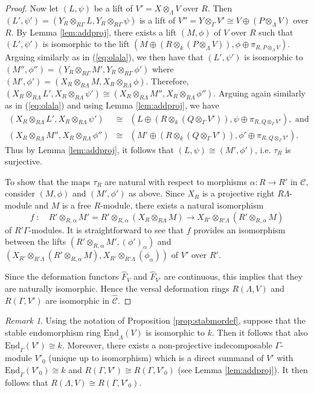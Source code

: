 \documentclass{amsart}
\theoremstyle{plain}
\theoremstyle{definition}
\theoremstyle{remark}
\newtheorem{rem}[thm]{Remark}
\begin{document}
\begin{proof}
Now let $(L,\psi)$ be a lift of $V'=X\otimes_{\Lambda}V$ over $R$.  Then 
$(L',\psi')= (Y_R\otimes_{R\Gamma}L,Y_R\otimes_{R\Gamma}\psi)$ is a lift of 
$V''=Y\otimes_{\Gamma}V'\cong V \oplus (P\otimes_\Lambda V)$ over $R$. By Lemma \ref{lem:addproj}, there exists a lift 
$(M,\phi)$ of $V$ over $R$ such that $(L',\psi')$ is isomorphic to the lift
$\left(M\oplus (R\otimes_k (P\otimes_\Lambda V)),\phi\oplus\pi_{R,P\otimes_\Lambda V}\right)$.
Arguing similarly as in (\ref{eq:olala}), we then have that $(L',\psi')$ is isomorphic to $(M'',\phi'')=
(Y_R\otimes_{R\Gamma}M',Y_R\otimes_{R\Gamma}\phi')$ where $(M',\phi')=(X_R \otimes_{R\Lambda}M,X_R\otimes_{R\Lambda}\phi)$. Therefore, $(X_R\otimes_{R\Lambda}L' ,X_R\otimes_{R\Lambda}\psi')\cong (X_R\otimes_{R\Lambda}M'',X_R\otimes_{R\Lambda}\phi'')$.
Arguing again similarly as in (\ref{eq:olala}) and using Lemma \ref{lem:addproj}, we have 
\begin{eqnarray*}
(X_R\otimes_{R\Lambda}L' ,X_R\otimes_{R\Lambda}\psi') 
&\cong&\left(L\oplus (R\otimes_k (Q\otimes_\Gamma V')),\psi\oplus \pi_{R,Q\otimes_\Gamma V'}\right),
\mbox{ and }\\
(X_R\otimes_{R\Lambda}M'',X_R\otimes_{R\Lambda}\phi'')
&\cong&\left(M' \oplus (R\otimes_k (Q\otimes_\Gamma V')),\phi'\oplus \pi_{R,Q\otimes_\Gamma V'}\right).
\end{eqnarray*}
Thus by Lemma \ref{lem:addproj}, it follows that $(L,\psi)\cong (M',\phi')$, i.e. $\tau_R$ is surjective.

To show that the maps $\tau_R$ are natural with respect to morphisms $\alpha:R\to R'$ in 
$\mathcal{C}$, consider $(M,\phi)$ and $(M',\phi')$ as above.
Since $X_R$ is a projective right $R\Lambda$-module and
$M$ is a free $R$-module, there exists a natural isomorphism
$$f\;:\quad R' \otimes_{R,\alpha}M'= 
R'\otimes_{R,\alpha}(X_R\otimes_{R\Lambda}M)
\to X_{R'}\otimes_{R'\Lambda}(R'\otimes_{R,\alpha} M)$$
of $R'\Gamma$-modules. It is straightforward to see that $f$ provides an isomorphism between the
lifts $(R'\otimes_{R,\alpha}M',(\phi')_\alpha)$ and 
$(X_{R'} \otimes_{R'\Lambda} (R'\otimes_{R,\alpha}M),X_{R'}\otimes_{R'\Lambda}(\phi_\alpha))$
of $V'$ over $R'$.

Since the deformation functors $\hat{F}_V$ and $\hat{F}_{V'}$ are continuous, this implies that they are naturally isomorphic. Hence the versal deformation rings $R(\Lambda,V)$ and $R(\Gamma,V')$ are isomorphic in $\hat{\mathcal{C}}$.
\end{proof}

\begin{rem}
\label{rem:stabmor}
Using the notation of Proposition \ref{prop:stabmordef}, suppose that the stable endomorphism ring 
$\underline{\mathrm{End}}_{\Lambda}(V)$ is isomorphic to $k$. Then it follows that also $\underline{\mathrm{End}}_{\Gamma}(V')\cong k$. 
Moreover, there exists a non-projective indecomposable $\Gamma$-module $V'_0$ (unique up to isomorphism) which is a 
direct summand of  $V'$ with $\underline{\mathrm{End}}_{\Gamma}(V'_0)\cong k$ and $R(\Gamma,V')\cong R(\Gamma,V'_0)$
(see Lemma \ref{lem:addproj}). 
It then follows that $R(\Lambda,V)\cong R(\Gamma,V'_0)$. \end{rem}
\end{document}
